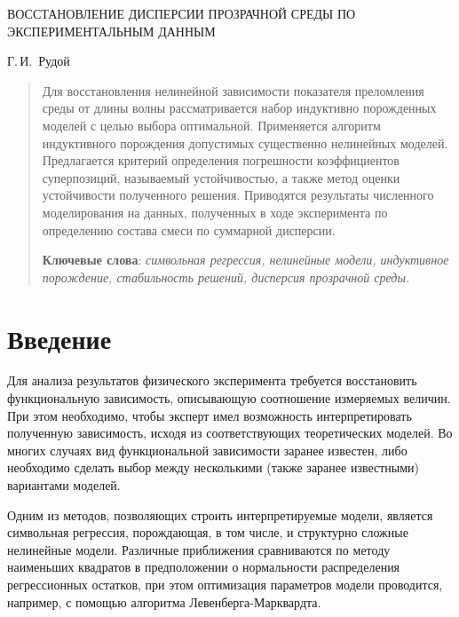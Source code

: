 \documentclass[12pt,a4paper]{article}
\theoremstyle{definition}
\begin{document}
\lstset{language=C++}

\begin{center}
  ВОССТАНОВЛЕНИЕ ДИСПЕРСИИ ПРОЗРАЧНОЙ СРЕДЫ ПО ЭКСПЕРИМЕНТАЛЬНЫМ ДАННЫМ

  \bigskip
  Г.\,И.~Рудой
\end{center}

\begin{abstract}
  Для восстановления нелинейной зависимости показателя преломления среды от длины
  волны рассматривается набор индуктивно порожденных моделей с целью выбора оптимальной.
  Применяется алгоритм индуктивного порождения допустимых существенно
  нелинейных моделей. Предлагается критерий определения погрешности коэффициентов 
  суперпозиций, называемый устойчивостью, а также метод оценки устойчивости полученного решения.
  Приводятся результаты численного моделирования на данных, полученных в ходе
  эксперимента по определению состава смеси по суммарной дисперсии.

  \bigskip
  \textbf{Ключевые слова}: \emph{символьная регрессия, нелинейные модели, индуктивное порождение,
	стабильность решений, дисперсия прозрачной среды.}
\end{abstract}

\section*{Введение}

Для анализа результатов физического эксперимента требуется восстановить функциональную зависимость, описывающую соотношение измеряемых величин. При этом необходимо, чтобы эксперт имел возможность интерпретировать полученную зависимость, исходя из соответствующих теоретических моделей. Во многих случаях вид функциональной зависимости заранее известен, либо необходимо сделать выбор между несколькими (также заранее известными) вариантами моделей.

Одним из методов, позволяющих строить интерпретируемые модели, является символьная регрессия\cite{davidson:2000:snrea,reference/ml/X10vc,StrijovW10,Strijov08InductMethods,Rudoy13}, порождающая, в том числе, и структурно сложные нелинейные модели. Различные приближения сравниваются по методу наименьших квадратов в предположении о нормальности распределения регрессионных остатков, при этом оптимизация параметров модели проводится, например, с помощью алгоритма Левенберга-Марквардта\cite{Marquardt1963Algorithm,more:78}.
\end{document}
